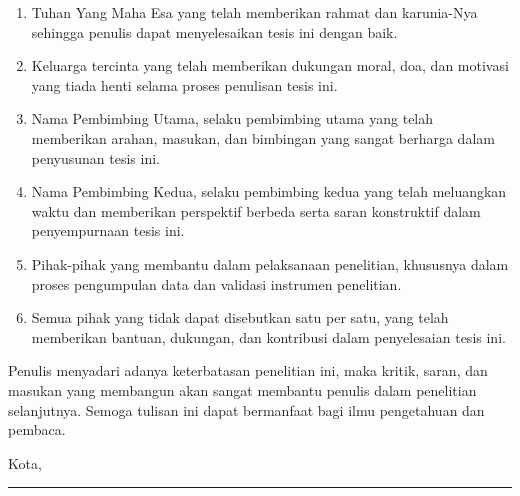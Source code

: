 \begin{enumerate}
    \item {Tuhan Yang Maha Esa yang telah memberikan rahmat dan karunia-Nya sehingga penulis dapat menyelesaikan tesis ini dengan baik.}

    \item {Keluarga tercinta yang telah memberikan dukungan moral, doa, dan motivasi yang tiada henti selama proses penulisan tesis ini.}

    \item {{Nama Pembimbing Utama}, selaku pembimbing utama yang telah memberikan arahan, masukan, dan bimbingan yang sangat berharga dalam penyusunan tesis ini.}

    \item {{Nama Pembimbing Kedua}, selaku pembimbing kedua yang telah meluangkan waktu dan memberikan perspektif berbeda serta saran konstruktif dalam penyempurnaan tesis ini.}

    \item {Pihak-pihak yang membantu dalam pelaksanaan penelitian, khususnya dalam proses pengumpulan data dan validasi instrumen penelitian.}

    \item Semua pihak yang tidak dapat disebutkan satu per satu, yang telah memberikan bantuan, dukungan, dan kontribusi dalam penyelesaian tesis ini.
\end{enumerate}

Penulis menyadari adanya keterbatasan penelitian ini, maka kritik, saran, dan masukan yang membangun akan sangat membantu penulis dalam penelitian selanjutnya. Semoga tulisan ini dapat bermanfaat bagi ilmu pengetahuan dan pembaca.


\vspace{1cm}
\begin{flushright}
{Kota}, \rule{2.5cm}{0.4pt}\\  %
\vspace{3em}
\AuthorNameB
\end{flushright}
